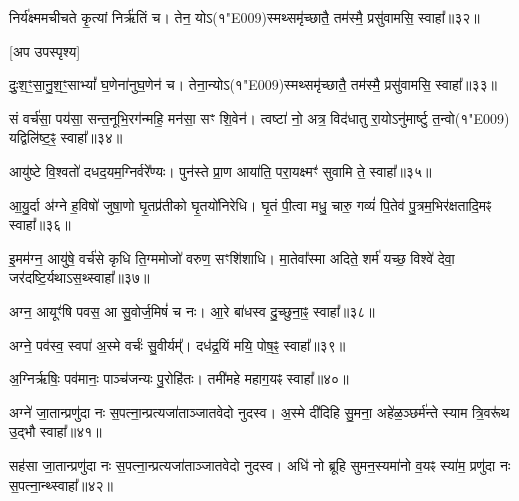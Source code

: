 

निर्य॑क्ष्ममचीचते कृ॒त्यां निर्\mbox{}ऋ॑तिं च। 
तेन॒ योऽ(१\char"E009)स्मथ्समृ॑च्छातै॒ तम॑स्मै॒ प्रसु॑वामसि॒ स्वाहा᳚॥३२॥

 [अप उपस्पृश्य]


दुः॒श॒ꣳ॒सा॒नु॒श॒ꣳ॒साभ्यां᳚ घ॒णेना॑नुघ॒णेन॑ च। 
तेना॒न्योऽ(१\char"E009)स्मथ्समृ॑च्छातै॒ तम॑स्मै॒ प्रसु॑वामसि॒ स्वाहा᳚॥३३॥




सं वर्च॑सा॒ पय॑सा॒ सन्त॒नूभि॒रग॑न्महि॒ मन॑सा॒ सꣳ शि॒वेन॑। 
त्वष्टा॑ नो॒ अत्र॒ विद॑धातु रा॒योऽनु॑मार्ष्टु त॒न्वो(१\char"E009) यद्विलि॑ष्ट॒ꣴ॒ स्वाहा᳚॥३४॥



आयु॑ष्टे वि॒श्वतो॑ दधद॒यम॒ग्निर्वरे᳚ण्यः। 
पुन॑स्ते प्रा॒ण आया॑ति॒ परा॒यक्ष्मꣳ॑ सुवामि ते॒ स्वाहा᳚॥३५॥



आ॒यु॒र्दा अ॑ग्ने ह॒विषो॑ जुषा॒णो घृ॒तप्र॑तीको घृ॒तयो॑निरेधि। 
घृ॒तं पी॒त्वा मधु॒ चारु॒ गव्यं॑ पि॒तेव॑ पु॒त्रम॒भिर॑क्षतादि॒मꣴ स्वाहा᳚॥३६॥



इ॒मम॑ग्न॒ आयु॑षे॒ वर्च॑से कृधि ति॒ग्ममोजो॑ वरुण॒ सꣳशि॑शाधि। 
मा॒तेवा᳚स्मा अदिते॒ शर्म॑ यच्छ॒ विश्वे॑ देवा॒ जर॑दष्टि॒र्यथा\-ऽस॒थ्स्वाहा᳚॥३७॥



अग्न॒ आयूꣳ॑षि पवस॒ आ सु॒वोर्ज॒मिषं॑ च नः। 
आ॒रे बा॑धस्व दु॒च्छुना॒ꣴ॒ स्वाहा᳚॥३८॥


अग्ने॒ पव॑स्व॒ स्वपा॑ अ॒स्मे वर्चः॑ सु॒वीर्यम्᳚। 
दध॑द्र॒यिं मयि॒ पोष॒ꣴ॒ स्वाहा᳚॥३९॥



अ॒ग्निर्\mbox{}ऋषिः॒ पव॑मानः॒ पाञ्च॑जन्यः पु॒रोहि॑तः। 
तमी॑महे महाग॒यꣴ स्वाहा᳚॥४०॥



अग्ने॑ जा॒तान्प्रणु॑दा नः स॒पत्ना॒न्प्रत्यजा॑ताञ्जातवेदो नुदस्व। 
अ॒स्मे दी॑दिहि सु॒मना॒ अहे॑ळ॒ञ्छर्म॑न्ते स्याम त्रि॒वरू॑थ उ॒द्भौ स्वाहा᳚॥४१॥



सह॑सा जा॒तान्प्रणु॑दा नः स॒पत्ना॒न्प्रत्यजा॑ताञ्जातवेदो नुदस्व। 
अधि॑ नो ब्रूहि सुमन॒स्यमा॑नो व॒यꣴ स्या॑म॒ प्रणु॑दा नः स॒पत्ना॒न्थ्स्वाहा᳚॥४२॥



